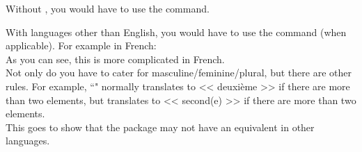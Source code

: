 Without , you would have to use the  command. \\



\newpage

With languages other than English, you would have to use the  command (when applicable). For example in French: \\



As you can see, this is more complicated in French. \\

Not only do you have to cater for masculine/feminine/plural, but there are other rules. For example, ``" normally translates to << deuxième >> if there are more than two elements, but translates to << second(e) >> if there are more than two elements. \\

This goes to show that the  package may not have an equivalent in other languages.
